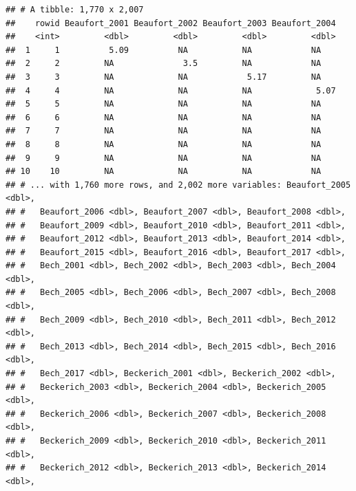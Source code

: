 \documentclass[]{gitbook}
\newenvironment{Shaded}{\begin{snugshade}}{\end{snugshade}}
\newcommand{\DataTypeTok}[1]{\textcolor[rgb]{0.13,0.29,0.53}{#1}}
\newcommand{\KeywordTok}[1]{\textcolor[rgb]{0.13,0.29,0.53}{\textbf{#1}}}
\newcommand{\NormalTok}[1]{#1}
\newcommand{\OperatorTok}[1]{\textcolor[rgb]{0.81,0.36,0.00}{\textbf{#1}}}
\newcommand{\StringTok}[1]{\textcolor[rgb]{0.31,0.60,0.02}{#1}}
\begin{document}
\begin{Shaded}
\end{Shaded}

\begin{verbatim}
## # A tibble: 1,770 x 2,007
##    rowid Beaufort_2001 Beaufort_2002 Beaufort_2003 Beaufort_2004
##    <int>         <dbl>         <dbl>         <dbl>         <dbl>
##  1     1          5.09          NA           NA            NA   
##  2     2         NA              3.5         NA            NA   
##  3     3         NA             NA            5.17         NA   
##  4     4         NA             NA           NA             5.07
##  5     5         NA             NA           NA            NA   
##  6     6         NA             NA           NA            NA   
##  7     7         NA             NA           NA            NA   
##  8     8         NA             NA           NA            NA   
##  9     9         NA             NA           NA            NA   
## 10    10         NA             NA           NA            NA   
## # ... with 1,760 more rows, and 2,002 more variables: Beaufort_2005 <dbl>,
## #   Beaufort_2006 <dbl>, Beaufort_2007 <dbl>, Beaufort_2008 <dbl>,
## #   Beaufort_2009 <dbl>, Beaufort_2010 <dbl>, Beaufort_2011 <dbl>,
## #   Beaufort_2012 <dbl>, Beaufort_2013 <dbl>, Beaufort_2014 <dbl>,
## #   Beaufort_2015 <dbl>, Beaufort_2016 <dbl>, Beaufort_2017 <dbl>,
## #   Bech_2001 <dbl>, Bech_2002 <dbl>, Bech_2003 <dbl>, Bech_2004 <dbl>,
## #   Bech_2005 <dbl>, Bech_2006 <dbl>, Bech_2007 <dbl>, Bech_2008 <dbl>,
## #   Bech_2009 <dbl>, Bech_2010 <dbl>, Bech_2011 <dbl>, Bech_2012 <dbl>,
## #   Bech_2013 <dbl>, Bech_2014 <dbl>, Bech_2015 <dbl>, Bech_2016 <dbl>,
## #   Bech_2017 <dbl>, Beckerich_2001 <dbl>, Beckerich_2002 <dbl>,
## #   Beckerich_2003 <dbl>, Beckerich_2004 <dbl>, Beckerich_2005 <dbl>,
## #   Beckerich_2006 <dbl>, Beckerich_2007 <dbl>, Beckerich_2008 <dbl>,
## #   Beckerich_2009 <dbl>, Beckerich_2010 <dbl>, Beckerich_2011 <dbl>,
## #   Beckerich_2012 <dbl>, Beckerich_2013 <dbl>, Beckerich_2014 <dbl>,

\end{verbatim}
\end{document}

